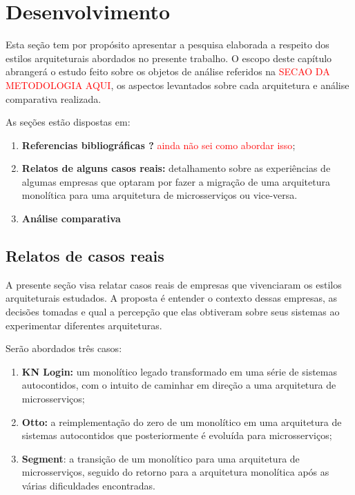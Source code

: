 \chapter{Desenvolvimento}

Esta seção tem por propósito apresentar a pesquisa elaborada a respeito dos estilos arquiteturais
abordados no presente trabalho. O escopo deste capítulo abrangerá o estudo feito sobre os objetos de
análise referidos na \textcolor{red}{SECAO DA METODOLOGIA AQUI}, os aspectos levantados sobre cada
arquitetura e análise comparativa realizada.

As seções estão dispostas em:

  \begin{enumerate}
    \item \textbf{Referencias bibliográficas ?} \textcolor{red}{ainda não sei como abordar isso};
    \item \textbf{Relatos de alguns casos reais:} detalhamento sobre as experiências de algumas empresas
    que optaram por fazer a migração de uma arquitetura monolítica para uma arquitetura de
    microsserviços ou vice-versa.
    \item \textbf{Análise comparativa}
  \end{enumerate}

\section{Relatos de casos reais}

A presente seção visa relatar casos reais de empresas que vivenciaram os estilos arquiteturais
estudados. A proposta é entender o contexto dessas empresas, as decisões tomadas e qual a percepção
que elas obtiveram sobre seus sistemas ao experimentar diferentes arquiteturas.

Serão abordados três casos:

\begin{enumerate}
    \item \textbf{KN Login:} um monolítico legado transformado em uma série de sistemas autocontidos, com o
        intuito de caminhar em direção a uma arquitetura de microsserviços;
    \item \textbf{Otto:} a reimplementação do zero de um monolítico em uma arquitetura de sistemas
        autocontidos que posteriormente é evoluída para microsserviços;
    \item \textbf{Segment}: a transição de um monolítico para uma arquitetura de microsserviços,
        seguido do retorno para a arquitetura monolítica após as várias dificuldades encontradas.
\end{enumerate}

